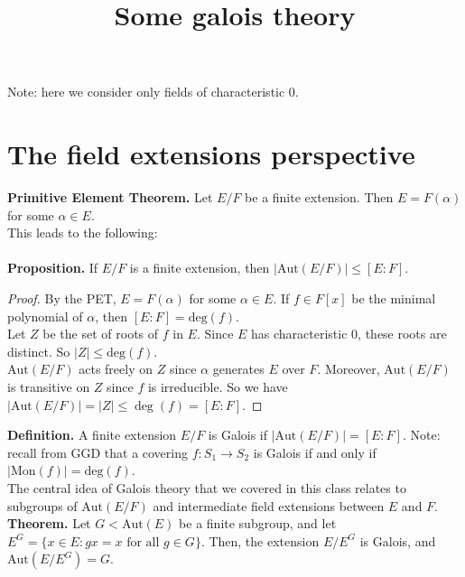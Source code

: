 \documentclass[10pt]{article}
\theoremstyle{definition}
\theoremstyle{remark}
\theoremstyle{definition}
\begin{document}
  

\title{Some galois theory}
\date{\vspace{-5ex}}
\author{\vspace{-5ex}}
\maketitle

\pagestyle{empty}   
\thispagestyle{empty}   
\noindent Note: here we consider only fields of characteristic $0$.
\section{The field extensions perspective}

\textbf{Primitive Element Theorem.} Let $E/F$ be a finite extension. Then $E = F(\alpha)$ for some $\alpha \in E$.\\

This leads to the following:\\\\
\noindent\textbf{Proposition.} If $E/F$ is a finite extension, then $|\mbox{Aut}(E/F)| \leq [E:F]$.
\begin{proof}
By the PET, $E = F(\alpha)$ for some $\alpha \in E$. If $f \in F[x]$ be the minimal polynomial of $\alpha$, then $[E:F] = \mbox{deg}(f)$.\\

\noindent Let $Z$ be the set of roots of $f$ in $E$. Since $E$ has characteristic $0$, these roots are distinct. So $|Z| \leq \mbox{deg}(f)$.\\

\noindent $\mbox{Aut}(E/F)$ acts freely on $Z$ since $\alpha$ generates $E$ over $F$. Moreover, $\mbox{Aut}(E/F)$ is transitive on $Z$ since $f$ is irreducible. So we have $|\mbox{Aut}(E/F)| = |Z|\leq \deg(f)=[E:F]$.
\end{proof}

\noindent\textbf{Definition.} A finite extension $E/F$ is Galois if $|\mbox{Aut}(E/F)| = [E:F]$. Note: recall from GGD that a covering $f:S_1\to S_2$ is Galois if and only if $|\mbox{Mon}(f)| = \mbox{deg}(f)$.\\

The central idea of Galois theory that we covered in this class relates to subgroups of $\mbox{Aut}(E/F)$ and intermediate field extensions between $E$ and $F$.\\

\noindent\textbf{Theorem.} Let $G < \mbox{Aut}(E)$ be a finite subgroup, and let $E^G = \{x \in E:gx = x \mbox{ for all }g\in G\}$. Then, the extension $E/E^G$ is Galois, and $\mbox{Aut}(E/E^G) = G$.\\
 
\end{document}
